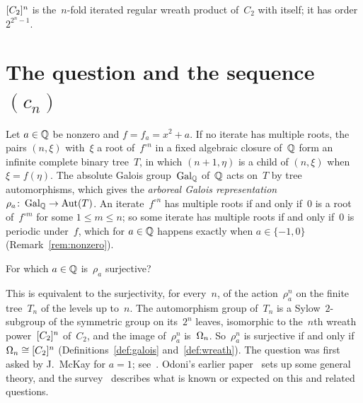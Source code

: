 \begin{definition}
  \label{def:wreath}
  \leanok
  $[C_2]^{n}$ is the~$n$-fold iterated regular wreath product of~$C_2$ with itself; it has order
  $2^{2^n - 1}$.
\end{definition}

\section{The question and the sequence \texorpdfstring{$(c_n)$}{(c\_n)}}
\paperitems

Let $a \in \mathbb{Q}$ be nonzero and $f = f_a = x^2 + a$. If no iterate has multiple roots, the pairs
$(n, \xi)$ with~$\xi$ a root of~$f^{\circ n}$ in a fixed algebraic closure of~$\mathbb{Q}$ form an infinite
complete binary tree~$T$, in which $(n + 1, \eta)$ is a child of $(n, \xi)$ when $\xi = f(\eta)$.
The absolute Galois group~$\operatorname{Gal}_{\mathbb{Q}}$ of~$\mathbb{Q}$ acts on~$T$ by tree automorphisms, which gives the
\emph{arboreal Galois representation} $\rho_a \colon \operatorname{Gal}_{\mathbb{Q}} \to \operatorname{Aut}(T)$. An
iterate~$f^{\circ n}$ has multiple roots if and only if~$0$ is a root of~$f^{\circ m}$ for some
$1 \le m \le n$; so some iterate has multiple roots if and only if~$0$ is periodic under~$f$,
which for $a \in \mathbb{Q}$ happens exactly when $a \in \{-1, 0\}$ (Remark~\ref{rem:nonzero}).

\begin{question}
  For which $a \in \mathbb{Q}$ is~$\rho_a$ surjective?
\end{question}

This is equivalent to the surjectivity, for every~$n$, of the action~$\rho_a^n$ on the finite
tree~$T_n$ of the levels up to~$n$. The automorphism group of~$T_n$ is a Sylow~$2$-subgroup of
the symmetric group on its~$2^n$ leaves, isomorphic to the~$n$th wreath power~$[C_2]^{n}$ of~$C_2$,
and the image of~$\rho^n_a$ is~$\Omega_n$. So~$\rho^n_a$ is surjective if and only if
$\Omega_n \cong [C_2]^{n}$ (Definitions~\ref{def:galois} and~\ref{def:wreath}). The question was first
asked by J.~McKay for $a = 1$; see~\cite{odoni}. Odoni's earlier paper~\cite{odoni1985} sets up
some general theory, and the survey~\cite{jones} describes what is known or expected on this and
related questions.

